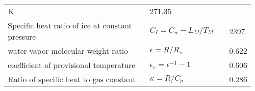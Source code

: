 \begin{longtable}[]{@{}llll@{}}
\begin{minipage}[t]{0.22\columnwidth}
K\strut
\end{minipage} & \begin{minipage}[t]{0.22\columnwidth}\raggedright
271.35\strut
\end{minipage}\tabularnewline
\begin{minipage}[t]{0.22\columnwidth}\raggedright
Specific heat ratio of ice at constant pressure\strut
\end{minipage} & \begin{minipage}[t]{0.22\columnwidth}\raggedright
\(C_I = C_w - L_M/T_M\)\strut
\end{minipage} & \begin{minipage}[t]{0.22\columnwidth}\raggedright
\strut
\end{minipage} & \begin{minipage}[t]{0.22\columnwidth}\raggedright
2397.\strut
\end{minipage}\tabularnewline
\begin{minipage}[t]{0.22\columnwidth}\raggedright
water vapor molecular weight ratio\strut
\end{minipage} & \begin{minipage}[t]{0.22\columnwidth}\raggedright
\(\epsilon = R/R_v\)\strut
\end{minipage} & \begin{minipage}[t]{0.22\columnwidth}\raggedright
\strut
\end{minipage} & \begin{minipage}[t]{0.22\columnwidth}\raggedright
0.622\strut
\end{minipage}\tabularnewline
\begin{minipage}[t]{0.22\columnwidth}\raggedright
coefficient of provisional temperature\strut
\end{minipage} & \begin{minipage}[t]{0.22\columnwidth}\raggedright
\(\epsilon_v = \epsilon^{-1} - 1\)\strut
\end{minipage} & \begin{minipage}[t]{0.22\columnwidth}\raggedright
\strut
\end{minipage} & \begin{minipage}[t]{0.22\columnwidth}\raggedright
0.606\strut
\end{minipage}\tabularnewline
\begin{minipage}[t]{0.22\columnwidth}\raggedright
Ratio of specific heat to gas constant\strut
\end{minipage} & \begin{minipage}[t]{0.22\columnwidth}\raggedright
\(\kappa = R/C_p\)\strut
\end{minipage} & \begin{minipage}[t]{0.22\columnwidth}\raggedright
\strut
\end{minipage} & \begin{minipage}[t]{0.22\columnwidth}\raggedright
0.286\strut
\end{minipage}\tabularnewline
\bottomrule
\end{longtable}
